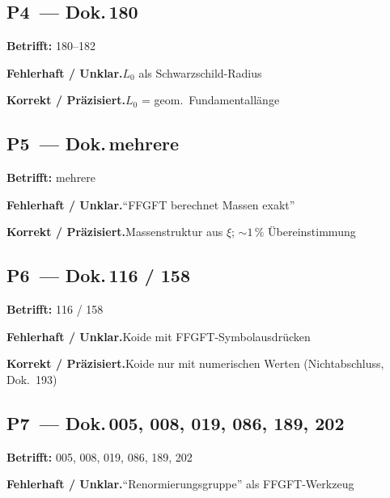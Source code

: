 \medskip


\subsection*{P4~--- Dok.\,180}

\noindent\textbf{Betrifft:} 180--182


\smallskip\noindent\textbf{Fehlerhaft / Unklar.}\quad $L_0$ als Schwarzschild-Radius


\smallskip\noindent\textbf{Korrekt / Präzisiert.}\quad $L_0$ = geom.\ Fundamentallänge


\medskip


\subsection*{P5~--- Dok.\,mehrere}

\noindent\textbf{Betrifft:} mehrere


\smallskip\noindent\textbf{Fehlerhaft / Unklar.}\quad \enquote{FFGFT berechnet Massen exakt}


\smallskip\noindent\textbf{Korrekt / Präzisiert.}\quad Massenstruktur aus $\xi$; $\sim 1\,\%$ Übereinstimmung


\medskip


\subsection*{P6~--- Dok.\,116 / 158}

\noindent\textbf{Betrifft:} 116 / 158


\smallskip\noindent\textbf{Fehlerhaft / Unklar.}\quad Koide mit FFGFT-Symbolausdrücken


\smallskip\noindent\textbf{Korrekt / Präzisiert.}\quad Koide nur mit numerischen Werten (Nichtabschluss, Dok.~193)


\medskip


\subsection*{P7~--- Dok.\,005, 008, 019, 086, 189, 202}

\noindent\textbf{Betrifft:} 005, 008, 019, 086, 189, 202


\smallskip\noindent\textbf{Fehlerhaft / Unklar.}\quad \enquote{Renormierungsgruppe} als FFGFT-Werkzeug


